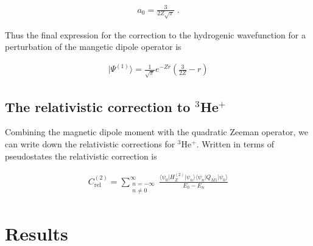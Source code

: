             \begin{align}
                a_0 = \frac{3}{2Z\sqrt{\pi}}\;.
            \end{align}

            Thus the final expression for the correction to the hydrogenic wavefunction for a perturbation of the mangetic dipole operator is 

            \begin{align}
                \vert \varPsi^{(1)} \rangle = \frac{1}{\sqrt{\pi}} e^{-Zr} \left( \frac{3}{2Z} - r\right)
            \end{align}

        \subsection{The relativistic correction to $^3$He$^+$}\label{sec:Relativistic_Correction}
            Combining the magnetic dipole moment with the quadratic Zeeman operator, we can write down the relativistic corrections for $^3$He$^+$. Written in terms of pseudostates the relativistic correction is

            \begin{align}
                C_{\text{rel}}^{(2)} =\sum_{\substack{n = -\infty \\ n \neq 0}}^{\infty}
                \frac{\langle \psi_0 \vert H_Z^{(2)} \vert \psi_n \rangle \langle \psi_n \vert Q_{M1} \vert \psi_0 \rangle}{E_0 - E_n}
            \end{align}

    \section{Results}\label{sec:results}





